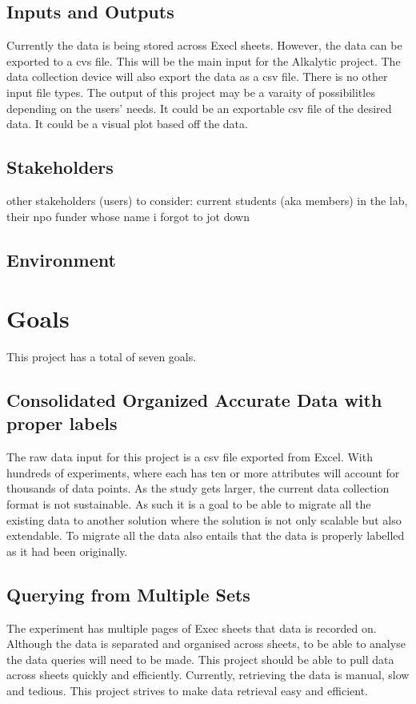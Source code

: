 \documentclass{article}
\begin{document}
\subsection{Inputs and Outputs}
Currently the data is being stored across Execl sheets. However, the data can be exported to a cvs file. This will be the main input for the Alkalytic project. 
The data collection device will also export the data as a csv file. There is no other input file types. 
\newline 
The output of this project may be a varaity of possibilitles depending on the users' needs. It could be an exportable csv file of the desired data. 
It could be a visual plot based off the data.  

\subsection{Stakeholders}
other stakeholders (users) to consider: current students (aka members) in the lab, their npo funder whose name i forgot to jot down

\subsection{Environment}


\section{Goals}
This project has a total of seven goals.
\subsection*{Consolidated Organized Accurate Data with proper labels}
The raw data input for this project is a csv file exported from Excel. With hundreds of experiments,
where each has ten or more attributes will account for thousands of data points. As the study gets larger, the current data collection format is not sustainable.
As such it is a goal to be able to migrate all the existing data to another solution where the solution is not only scalable but also extendable.
To migrate all the data also entails that the data is properly labelled as it had been originally.


\subsection*{Querying from Multiple Sets}
The experiment has multiple pages of Exec sheets that data is recorded on. Although the data is separated and organised across sheets, to be able to analyse the data queries will need to be made.
This project should be able to pull data across sheets quickly and efficiently. Currently, retrieving the data is manual, slow and tedious.
This project strives to make data retrieval easy and efficient.  
\end{document}
